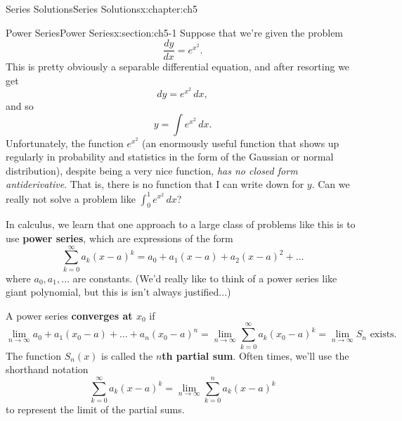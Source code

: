 \documentclass[oneside,10pt,]{book}
\newcommand{\terminology}[1]{\textbf{#1}}
\numberwithin{equation}{section}
\numberwithin{equation}{section}
\begin{document}
\begin{chapterptx}{Series Solutions}{}{Series Solutions}{}{}{x:chapter:ch5}
%
%
\typeout{************************************************}
\typeout{************************************************}
%
\begin{sectionptx}{Power Series}{}{Power Series}{}{}{x:section:ch5-1}
Suppose that we're given the problem%
\begin{equation*}
\frac{dy}{dx} = e^{x^2}.
\end{equation*}
This is pretty obviously a separable differential equation, and after resorting we get%
\begin{equation*}
dy = e^{x^2} \,dx,
\end{equation*}
and so%
\begin{equation*}
y = \int e^{x^2} \, dx.
\end{equation*}
Unfortunately, the function \(e^{x^2}\) (an enormously useful function that shows up regularly in probability and statistics in the form of the Gaussian or normal distribution), despite being a very nice function, \emph{has no closed form antiderivative}. That is, there is no function that I can write down for \(y\). Can we really not solve a problem like \(\int_0^1 e^{x^2}\, dx\)?%
\par
In calculus, we learn that one approach to a large class of problems like this is to use \terminology{power series}, which are expressions of the form%
\begin{equation*}
\sum_{k=0}^\infty a_k(x - a)^k = a_0 + a_1 (x-a) + a_2 (x-a)^2 + \ldots
\end{equation*}
where \(a_0, a_1,\ldots\) are constants. (We'd really like to think of a power series like giant polynomial, but this is isn't always justified...)%
\par
A power series \terminology{converges at \(x_0\)} if%
\begin{equation*}
\lim_{n \to \infty} a_0 + a_1 (x_0 - a) + \ldots + a_n (x_0 -a)^n = \lim_{n\to \infty} \sum_{k=0}^{\infty} a_k (x_0 - a)^k = \lim_{n\to \infty} S_n \text{ exists.}
\end{equation*}
The function \(S_n(x)\) is called the \terminology{\(n\)th partial sum}. Often times, we'll use the shorthand notation%
\begin{equation*}
\sum_{k=0}^\infty a_k (x - a)^k = \lim_{n\to\infty} \sum_{k=0}^n a_k(x-a)^k
\end{equation*}
to represent the limit of the partial sums.%
\par

\end{sectionptx}
\end{chapterptx}
\end{document}
